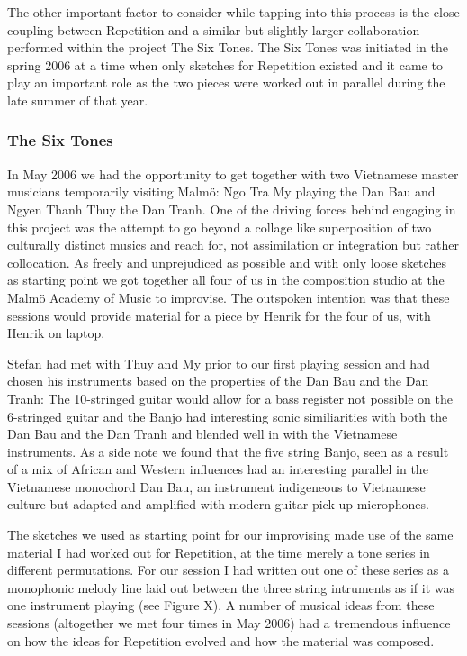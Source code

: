 The other important factor to consider while tapping into this process
is the close coupling between Repetition and a similar but slightly
larger collaboration performed within the project The Six Tones. The
Six Tones was initiated in the spring 2006 at a time when only
sketches for Repetition existed and it came to play an important role
as the two pieces were worked out in parallel during the late summer
of that year.

\subsubsection{The Six Tones }
\label{sec:six-tones-}

In May 2006 we had the opportunity to get together with two Vietnamese
master musicians temporarily visiting Malm\"{o}: Ngo Tra My playing
the Dan Bau and Ngyen Thanh Thuy the Dan Tranh. One of the driving
forces behind engaging in this project was the attempt to go beyond a
collage like superposition of two culturally distinct musics and reach
for, not assimilation or integration but rather collocation. As freely
and unprejudiced as possible and with only loose sketches as starting
point we got together all four of us in the composition studio at the
Malm\"{o} Academy of Music to improvise. The outspoken intention was
that these sessions would provide material for a piece by Henrik for
the four of us, with Henrik on laptop.

Stefan had met with Thuy and My prior to our first playing session and
had chosen his instruments based on the properties of the Dan Bau and
the Dan Tranh: The 10-stringed guitar would allow for a bass register
not possible on the 6-stringed guitar and the Banjo had interesting
sonic similiarities with both the Dan Bau and the Dan Tranh and
blended well in with the Vietnamese instruments. As a side note we
found that the five string Banjo, seen as a result of a mix of African
and Western influences had an interesting parallel in the Vietnamese
monochord Dan Bau, an instrument indigeneous to Vietnamese culture but
adapted and amplified with modern guitar pick up microphones.

The sketches we used as starting point for our improvising made use of
the same material I had worked out for Repetition, at the time merely
a tone series in different permutations. For our session I had written
out one of these series as a monophonic melody line laid out between
the three string intruments as if it was one instrument playing (see
Figure X). A number of musical ideas from these sessions (altogether
we met four times in May 2006) had a tremendous influence on how the
ideas for Repetition evolved and how the material was composed.


